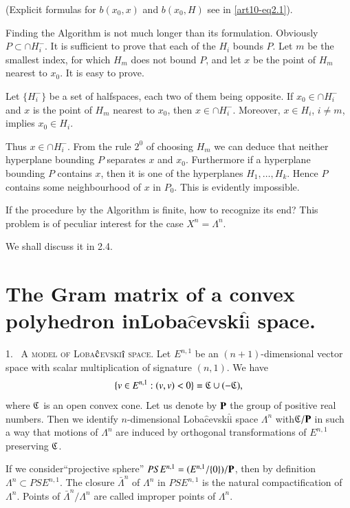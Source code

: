(Explicit formulas for $b (x_0, x)$ and $b(x_0, H)$ see in \ref{art10-eq2.1}).

Finding the Algorithm is not much longer than its formulation. Obviously $P\subset \cap H^-_i$. It is sufficient to prove that each of the $H_i$ bounds $P$. Let $m$ be the smallest index, for which $H_m$ does not bound $P$, and let $x$ be the point of $H_m$ nearest to $x_0$. It is easy to prove.

\setcounter{lemma}{3}
\begin{lemma}\label{art10-lem1.4}
Let $\{H^-_i\}$ be a set of halfspaces, each two of them being opposite. If $x_0 \in \cap H^-_i$ and $x$ is the point of $H_m$ nearest to $x_0$, then $x \in \cap H^-_i$. Moreover, $x \in H_i$, $i \neq m$, implies $x_0 \in H_i$.
\end{lemma}

Thus $x \in \cap H^-_i$. From the rule $2^0$ of choosing $H_m$ we can deduce that neither hyperplane bounding $P$ separates $x$ and $x_0$. Furthermore if a hyperplane bounding $P$ contains $x$, then it is one of the hyperplanes $H_1,\ldots, H_k$. Hence $P$ contains some neighbourhood of $x$ in $P_0$. This is evidently impossible.

If the procedure by the Algorithm is finite, how to recognize its end? This problem is of peculiar interest for the case $X^n = \Lambda^n$.

We shall discuss it in 2.4.

\section{The Gram matrix of a convex polyhedron in\break Loba$\hat{\text{c}}$evski$\hat{\text{i}}$ space.}\label{art10-sec2}

1.~ A \textsc{model of Loba$\hat{\textsc{c}}$evski$\hat{\textsc{i}}$ space.} Let $E^{n,1}$ be an $(n+1)$-dimensional vector space with scalar multiplication of signature $(n,1)$. We have
$$
\{v \in E^{n,1}: (v, v) < 0\} = \mathfrak{C} \cup (-\mathfrak{C}),
$$
where $\mathfrak{C}$ is an open convex cone. Let us denote by $\mathbf{P}$ the group of positive real numbers. Then we identify $n$-dimensional Loba$\hat{\text{c}}$evski$\hat{\text{i}}$ space $\Lambda^n$ with$\mathfrak{C}/\mathbf{P}$ in such a way that motions of $\Lambda^n$ are induced by orthogonal transformations of $E^{n,1}$ preserving $\mathfrak{C}$.

If we consider\pageoriginale ``projective sphere'' $PSE^{n,1} = (E^{n,1} / \{0\})/ \mathbf{P}$, then by definition $\Lambda^n \subset PSE^{n,1}$. The closure $\bar{\Lambda}^n$ of $\Lambda^n$ in $PSE^{n,1}$ is the natural compactification of $\Lambda^n$. Points of $\bar{\Lambda}^n/ \Lambda^n$ are called improper points of $\Lambda^n$.

